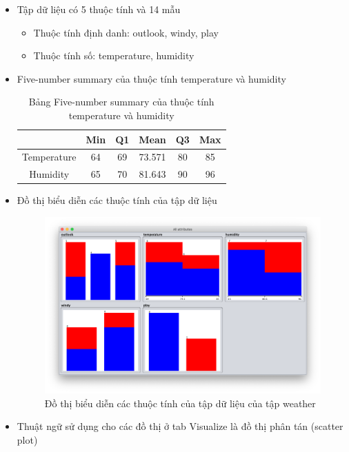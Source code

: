 \documentclass[a4paper, 12pt]{article}
\begin{document}
\begin{itemize}
    \item Tập dữ liệu có 5 thuộc tính và 14 mẫu
    \begin{itemize}
        \item Thuộc tính định danh: outlook, windy, play
        \item Thuộc tính số: temperature, humidity
    \end{itemize}

    \item Five-number summary của thuộc tính temperature và humidity
    \begin{table}[H]
        \begin{center}
            \begin{tabular}{|c|c|c|c|c|c|}
            \hline
                        & Min & Q1 & Mean   & Q3 & Max \\ \hline
            Temperature & 64  & 69 & 73.571 & 80 & 85  \\ \hline
            Humidity    & 65  & 70 & 81.643 & 90 & 96  \\ \hline
            \end{tabular}
            \caption{Bảng Five-number summary của thuộc tính temperature và humidity }
        \end{center}
    \end{table}

    \item Đồ thị biểu diễn các thuộc tính của tập dữ liệu
    \begin{figure}[H]
        \begin{center}
            \includegraphics[scale = 0.45]{images/weather_diagram.png}
            \caption{Đồ thị biểu diễn các thuộc tính của tập dữ liệu của tập weather}
        \end{center}
    \end{figure}

    \item Thuật ngữ sử dụng cho các đồ thị ở tab Visualize là đồ thị phân tán (scatter plot)
\end{itemize}
\end{document}
